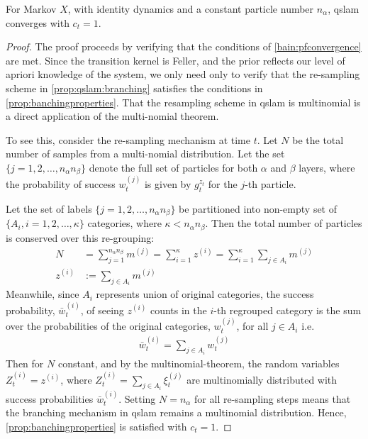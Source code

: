 \begin{proposition} \label{qslam:convergence}
	For Markov $X$, with identity dynamics and a constant particle number $n_\alpha$, qslam converges with $c_t=1$. 
	
	\begin{proof} The proof proceeds by verifying that the conditions of \cref{bain:pfconvergence} are met. Since the transition kernel is Feller, and the prior reflects our level of apriori knowledge of the system, we only need only to verify that the re-sampling scheme in \cref{prop:qslam:branching} satisfies the conditions in \cref{prop:banchingproperties}. That the resampling scheme in qslam is multinomial  is a direct application of the multi-nomial theorem.
	
	To see this, consider the re-sampling mechanism at time $t$. Let $N$ be the total number of samples from a multi-nomial distribution. Let the set $\{ j= 1, 2, \hdots, n_\alpha n_\beta\}$ denote the full set of particles for both $\alpha$ and $\beta$ layers, where the probability of success $w_t^{(j)}$ is given by $g_t^{z_t}$ for the $j$-th particle. 
	
	
	Let the set of labels $\{ j= 1, 2, \hdots, n_\alpha n_\beta\}$ be partitioned into non-empty set of $\{A_i, i = 1, 2, \hdots,\kappa\}$ categories, where $\kappa < n_\alpha n_\beta$. Then the total number of particles is conserved over this re-grouping:
	\begin{align}
	N &= \sum_{j = 1}^{n_\alpha n_\beta}  m^{(j)} = \sum_{i = 1}^{\kappa}  z^{(i)} =\sum_{i = 1}^{\kappa} \sum_{j \in A_i}  m^{(j)} \\
	 z^{(i)} &:= \sum_{j \in A_i}  m^{(j)} 
	\end{align} Meanwhile, since $ A_i$ represents union of original categories, the success probability, $	\bar{w}_t^{(i)}$, of seeing $z^{(i)}$ counts in the $i$-th regrouped category is the sum over the probabilities of the original categories, $w_t^{(j)}$, for all $ j \in A_i$ i.e.
	\begin{align}
	\bar{w}_t^{(i)} = \sum_{j \in A_i} w_t^{(j)}
	\end{align}
	Then for $N$ constant, and by the multinomial-theorem, the random variables $Z_t^{(i)} = z^{(i)}$, where $Z_t^{(i)} = \sum_{j \in A_i}\xi_t^{(j)}$ are multinomially distributed with success probabilities $\bar{w}_t^{(i)}$. Setting $N = n_\alpha$ for all re-sampling steps means that the branching mechanism in qslam remains a multinomial distribution. Hence,  \cref{prop:banchingproperties} is satisfied with $c_t=1$.
	\end{proof}
		
\end{proposition}
